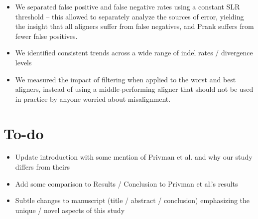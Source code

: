 \documentclass{article}
\begin{document}
\begin{itemize}

\item{We separated false positive and false negative rates using a constant SLR threshold -- this allowed to separately analyze the sources of error, yielding the insight that all aligners suffer from false negatives, and Prank suffers from fewer false positives.}
\item{We identified consistent trends across a wide range of indel rates / divergence levels}
\item{We measured the impact of filtering when applied to the worst and best aligners, instead of using a middle-performing aligner that should not be used in practice by anyone worried about misalignment.}

\end{itemize}

\section{To-do}

\begin{itemize}

\item{Update introduction with some mention of Privman et al. and why our study differs from theirs}
\item{Add some comparison to Results / Conclusion to Privman et al.'s results}
\item{Subtle changes to manuscript (title / abstract / conclusion) emphasizing the unique / novel aspects of this study}

\end{itemize}
\end{document}
